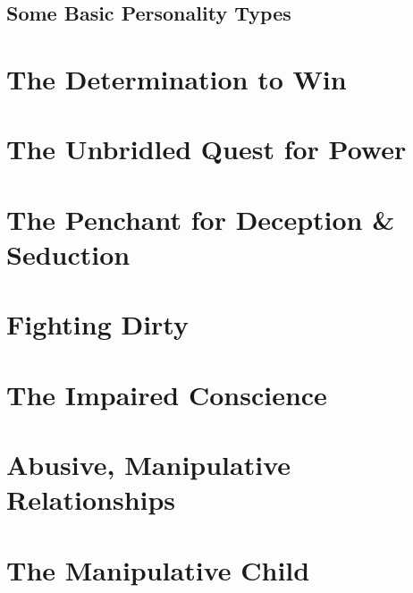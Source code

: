 \documentclass{article}
\numberwithin{equation}{section}
\begin{document}
\subsection{Some Basic Personality Types}


\section{The Determination to Win}


\section{The Unbridled Quest for Power}


\section{The Penchant for Deception \& Seduction}


\section{Fighting Dirty}


\section{The Impaired Conscience}


\section{Abusive, Manipulative Relationships}


\section{The Manipulative Child}
\end{document}
